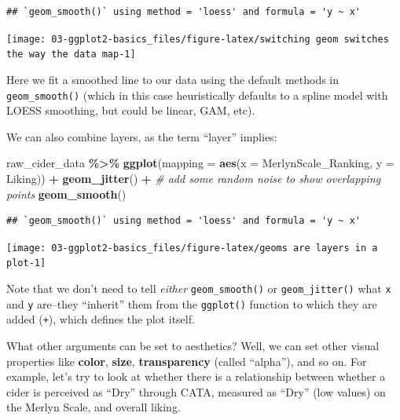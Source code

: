 \documentclass[
]{book}
\newenvironment{Shaded}{\begin{snugshade}}{\end{snugshade}}
\newcommand{\AttributeTok}[1]{\textcolor[rgb]{0.13,0.29,0.53}{#1}}
\newcommand{\CommentTok}[1]{\textcolor[rgb]{0.56,0.35,0.01}{\textit{#1}}}
\newcommand{\FunctionTok}[1]{\textcolor[rgb]{0.13,0.29,0.53}{\textbf{#1}}}
\newcommand{\NormalTok}[1]{#1}
\newcommand{\SpecialCharTok}[1]{\textcolor[rgb]{0.81,0.36,0.00}{\textbf{#1}}}
\begin{document}
\begin{verbatim}
## `geom_smooth()` using method = 'loess' and formula = 'y ~ x'
\end{verbatim}

\begin{center}\texttt{[image: 03-ggplot2-basics\_files/figure-latex/switching geom switches the way the data map-1]} \end{center}

Here we fit a smoothed line to our data using the default methods in \texttt{geom\_smooth()} (which in this case heuristically defaults to a spline model with LOESS smoothing, but could be linear, GAM, etc).

We can also combine layers, as the term ``layer'' implies:

\begin{Shaded}
\begin{Highlighting}[]
\NormalTok{raw\_cider\_data }\SpecialCharTok{\%\textgreater{}\%}
  \FunctionTok{ggplot}\NormalTok{(}\AttributeTok{mapping =} \FunctionTok{aes}\NormalTok{(}\AttributeTok{x =}\NormalTok{ MerlynScale\_Ranking, }\AttributeTok{y =}\NormalTok{ Liking)) }\SpecialCharTok{+} 
  \FunctionTok{geom\_jitter}\NormalTok{() }\SpecialCharTok{+} \CommentTok{\# add some random noise to show overlapping points}
  \FunctionTok{geom\_smooth}\NormalTok{()}
\end{Highlighting}
\end{Shaded}

\begin{verbatim}
## `geom_smooth()` using method = 'loess' and formula = 'y ~ x'
\end{verbatim}

\begin{center}\texttt{[image: 03-ggplot2-basics\_files/figure-latex/geoms are layers in a plot-1]} \end{center}

Note that we don't need to tell \emph{either} \texttt{geom\_smooth()} or \texttt{geom\_jitter()} what \texttt{x} and \texttt{y} are--they ``inherit'' them from the \texttt{ggplot()} function to which they are added (\texttt{+}), which defines the plot itself.

What other arguments can be set to aesthetics? Well, we can set other visual properties like \textbf{color}, \textbf{size}, \textbf{transparency} (called ``alpha''), and so on. For example, let's try to look at whether there is a relationship between whether a cider is perceived as ``Dry'' through CATA, measured as ``Dry'' (low values) on the Merlyn Scale, and overall liking.
\end{document}
